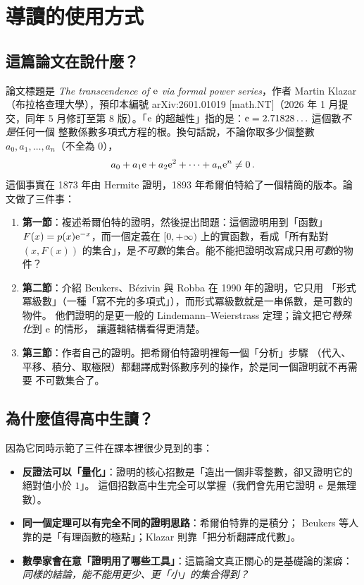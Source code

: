 \section*{導讀的使用方式}

\subsection*{這篇論文在說什麼？}

論文標題是 \emph{The transcendence of $\mathrm{e}$ via formal power series}，作者 Martin Klazar
（布拉格查理大學），預印本編號 arXiv:2601.01019 [math.NT]（2026 年 1 月提交，同年 5 月修訂至第 8 版）。「$\mathrm{e}$ 的超越性」指的是：$\mathrm{e}=2.71828\ldots$ 這個數\emph{不是}任何一個
整數係數多項式方程的根。換句話說，不論你取多少個整數 $a_0,a_1,\ldots,a_n$（不全為 $0$），
\[
  a_0+a_1\mathrm{e}+a_2\mathrm{e}^2+\cdots+a_n\mathrm{e}^n\neq 0\,.
\]
這個事實在 1873 年由 Hermite 證明，1893 年希爾伯特給了一個精簡的版本。論文做了三件事：
\begin{enumerate}
  \item \textbf{第一節}：複述希爾伯特的證明，然後提出問題：這個證明用到「函數」
        $F(x)=p(x)\mathrm{e}^{-x}$，而一個定義在 $[0,+\infty)$ 上的實函數，看成「所有點對 $(x,F(x))$
        的集合」，是\emph{不可數}的集合。能不能把證明改寫成只用\emph{可數}的物件？
  \item \textbf{第二節}：介紹 Beukers、Bézivin 與 Robba 在 1990 年的證明，它只用
        「形式冪級數」（一種「寫不完的多項式」），而形式冪級數就是一串係數，是可數的物件。
        他們證明的是更一般的 Lindemann--Weierstrass 定理；論文把它\emph{特殊化}到 $\mathrm{e}$ 的情形，
        讓邏輯結構看得更清楚。
  \item \textbf{第三節}：作者自己的證明。把希爾伯特證明裡每一個「分析」步驟
        （代入、平移、積分、取極限）都翻譯成對係數序列的操作，於是同一個證明就不再需要
        不可數集合了。
\end{enumerate}

\subsection*{為什麼值得高中生讀？}

因為它同時示範了三件在課本裡很少見到的事：
\begin{itemize}
  \item \textbf{反證法可以「量化」}：證明的核心招數是「造出一個非零整數，卻又證明它的絕對值小於 $1$」。
        這個招數高中生完全可以掌握（我們會先用它證明 $\mathrm{e}$ 是無理數）。
  \item \textbf{同一個定理可以有完全不同的證明思路}：希爾伯特靠的是積分；
        Beukers 等人靠的是「有理函數的極點」；Klazar 則靠「把分析翻譯成代數」。
  \item \textbf{數學家會在意「證明用了哪些工具」}：這篇論文真正關心的是基礎論的潔癖：
        \emph{同樣的結論，能不能用更少、更「小」的集合得到？}
\end{itemize}


